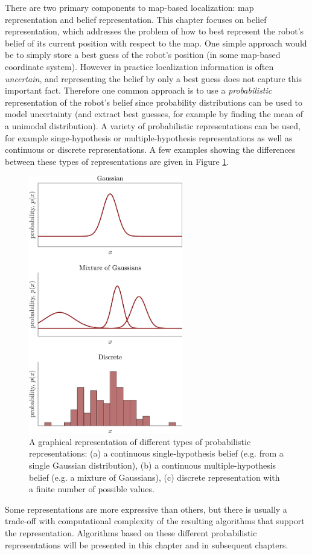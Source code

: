 There are two primary components to map-based localization: map representation and belief representation. This chapter focuses on belief representation, which addresses the problem of how to best represent the robot's belief of its current position with respect to the map. One simple approach would be to simply store a best guess of the robot's position (in some map-based coordinate system). However in practice localization information is often \textit{uncertain}, and representing the belief by only a best guess does not capture this important fact. Therefore one common approach is to use a \textit{probabilistic} representation of the robot's belief since probability distributions can be used to model uncertainty (and extract best guesses, for example by finding the mean of a unimodal distribution). A variety of probabilistic representations can be used, for example singe-hypothesis or multiple-hypothesis representations as well as continuous or discrete representations. A few examples showing the differences between these types of representations are given in Figure \ref{fig:belief-representation}.
\begin{figure}[ht!]
	\centering
    \includegraphics[width=0.6\textwidth]{tex/figs/ch14_figs/distributions.png}
    \caption{A graphical representation of different types of probabilistic representations: (a) a continuous single-hypothesis belief (e.g. from a single Gaussian distribution), (b) a continuous multiple-hypothesis belief (e.g. a mixture of Gaussians), (c) discrete representation with a finite number of possible values.}
    \label{fig:belief-representation}
\end{figure}
Some representations are more expressive than others, but there is usually a trade-off with computational complexity of the resulting algorithms that support the representation. Algorithms based on these different probabilistic representations will be presented in this chapter and in subsequent chapters.

